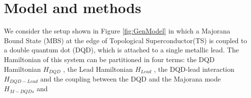 \documentclass[showpacs,aps,prb,reprint,superscriptaddress]{revtex4-1}
\newcommand{\TS}[1]{{$\rightarrow$ {\sl#1}}}
\newcommand{\LUIS}[1]{\textcolor{blue}{\fbox{Luis} {\sl#1}}}
\begin{document}














\section{Model and methods}
\label{sec:modelmethods}





We consider the setup shown in Figure \ref{fig:GenModel} in which a Majorana Bound State (MBS) at the edge of Topological Superconductor(TS) is coupled to a double quantum dot (DQD), which is attached to a single metallic lead. The Hamiltonian of this system can be partitioned in four terms: the DQD Hamiltonian $H_{DQD}$ , the Lead Hamiltonian $H_{Lead}$ , the DQD-lead interaction  $H_{DQD-Lead}$ and the coupling between the DQD and the Majorana mode $H_{M-DQDs}$ and   
\end{document}
